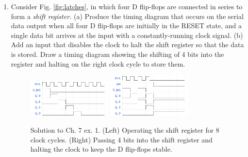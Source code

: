 \documentclass[10pt]{article}
\begin{document}
\begin{enumerate}
\item Consider Fig. \ref{fig:latches}, in which four D flip-flops are connected in series to form a \textit{shift register.}  (a) Produce the timing diagram that occurs on the serial data output when all four D flip-flops are initially in the RESET state, and a single data bit arrives at the input with a constantly-running clock signal.  (b) Add an input that disables the clock to halt the shift register so that the data is stored.  Draw a timing diagram showing the shifting of 4 bits into the register and halting on the right clock cycle to store them. \\ 
\begin{figure}[ht]
\centering
\includegraphics[width=0.4\textwidth]{figures/timingExample12.pdf} \hspace{0.5cm}
\includegraphics[width=0.4\textwidth]{figures/timingExample13.pdf}
\caption{\label{fig:shift} Solution to Ch. 7 ex. 1. (Left) Operating the shift register for 8 clock cycles. (Right) Passing 4 bits into the shift register and halting the clock to keep the D flip-flops stable.}
\end{figure}


\end{enumerate}
\end{document}

